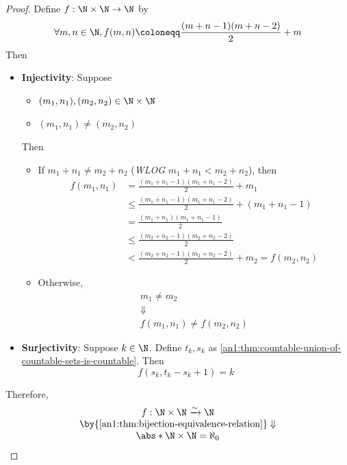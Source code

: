 \begin{proof}
  Define $f: \N \times \N \to \N$ by
  \[
    \forall m, n \in \N, f(m, n) \coloneqq \frac{(m + n - 1)(m + n - 2)}{2} + m
  \]
  Then
  \begin{itemize}
    \item \textbf{Injectivity}: Suppose
          \begin{itemize}
            \item $(m_{1}, n_{1}), (m_{2}, n_{2}) \in \N \times \N$
            \item $(m_{1}, n_{1}) \neq (m_{2}, n_{2})$
          \end{itemize}
          Then
          \begin{itemize}
            \item If $m_{1} + n_{1} \neq m_{2} + n_{2}$ (\emph{WLOG} $m_{1} + n_{1} < m_{2} + n_{2}$), then
                  \begin{align*}
                    f(m_{1}, n_{1}) & = \frac{(m_{1} + n_{1} - 1)(m_{1} + n_{1} - 2)}{2} + m_{1}                   \\
                                    & \leq \frac{(m_{1} + n_{1} - 1)(m_{1} + n_{1} - 2)}{2} + (m_{1} + n_{1} - 1)  \\
                                    & = \frac{(m_{1} + n_{1})(m_{1} + n_{1} - 1)}{2}                               \\
                                    & \leq \frac{(m_{2} + n_{2} - 1)(m_{2} + n_{2} - 2)}{2}                        \\
                                    & < \frac{(m_{2} + n_{2} - 1)(m_{2} + n_{2} - 2)}{2} + m_{2} = f(m_{2}, n_{2})
                  \end{align*}
            \item Otherwise,
                  \[
                    \begin{array}{c}
                      m_{1} \neq m_{2} \\
                      \Downarrow       \\
                      f(m_{1}, n_{1}) \neq f(m_{2}, n_{2})
                    \end{array}
                  \]
          \end{itemize}
    \item \textbf{Surjectivity}: Suppose $k \in \N$. Define $t_{k}, s_{k}$ as
          \cref{an1:thm:countable-union-of-countable-sets-is-countable}. Then
          \[
            f(s_{k}, t_{k} - s_{k} + 1) =  k
          \]
  \end{itemize}
  Therefore,
  \[
    \begin{array}{c}
      f: \N \times \N \xrightarrow{\sim} \N                         \\
      \by{\Cref{an1:thm:bijection-equivalence-relation}} \Downarrow \\
      \abs*{\N \times \N} = \aleph_{0}
    \end{array}
  \]
\end{proof}

